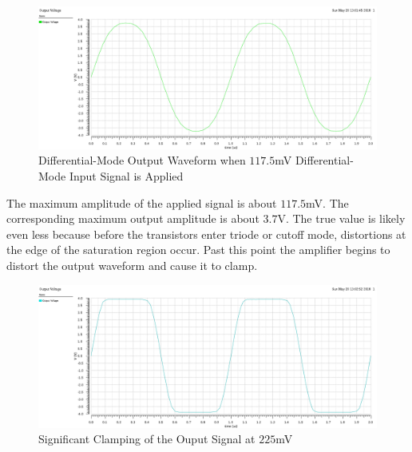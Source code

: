\FloatBarrier

\begin{figure}[h!]
	\centering
	\includegraphics[scale=0.40]{./images/sim4_max_sin.PNG}
	\caption{Differential-Mode Output Waveform when $117.5$\si{\milli\volt} Differential-Mode Input Signal is Applied}
	\label{fig:sim4_max_sin}
\end{figure}

\FloatBarrier

The maximum amplitude of the applied signal is about $117.5$\si{\milli\volt}.
The corresponding maximum output amplitude is about $3.7$\si{\volt}.
The true value is likely even less because before the transistors enter triode or cutoff mode, distortions at the edge of the saturation region occur.
Past this point the amplifier begins to distort the output waveform and cause it to clamp.

\FloatBarrier

\begin{figure}[h!]
	\centering
	\includegraphics[scale=0.40]{./images/sim4_past_max.PNG}
	\caption{Significant Clamping of the Ouput Signal at $225$\si{\milli\volt}}
	\label{fig:sim4_past_max}
\end{figure}

\FloatBarrier
